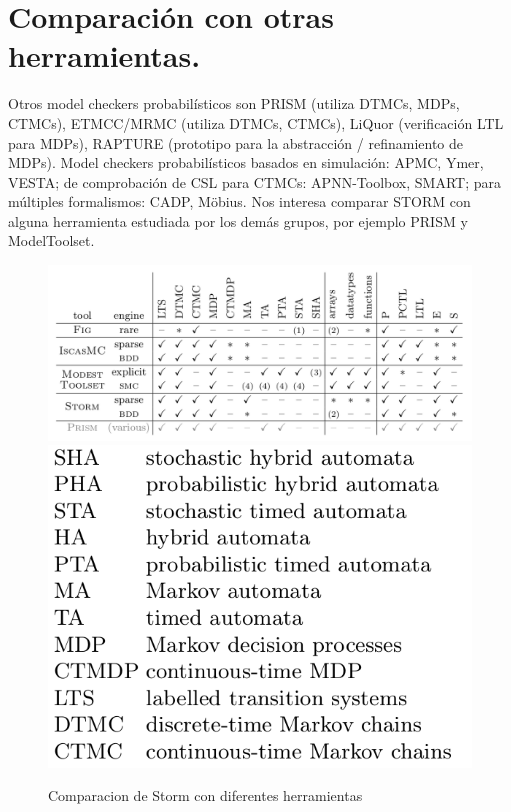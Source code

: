 \documentclass[11pt]{article}
\begin{document}
\section{Comparaci\'on con otras herramientas.}

Otros model checkers probabil\'isticos son PRISM (utiliza DTMCs, MDPs, CTMCs), ETMCC/MRMC (utiliza DTMCs, CTMCs), LiQuor (verificaci\'on LTL para MDPs), RAPTURE (prototipo para la abstracci\'on / refinamiento de MDPs). Model checkers probabil\'isticos basados en simulaci\'on: APMC, Ymer, VESTA; de comprobaci\'on de CSL para CTMCs: APNN-Toolbox, SMART; para m\'ultiples formalismos: CADP, M\"{o}bius. Nos interesa comparar STORM con alguna herramienta estudiada por los dem\'as grupos, por ejemplo PRISM y ModelToolset.  

\begin{figure}[h]
	\includegraphics[scale=0.28]{comparacion.png} 
	\includegraphics[scale=0.27]{significado.png} 
	\centering
	\caption{Comparacion de Storm con diferentes herramientas}%

\end{figure}
\end{document}
